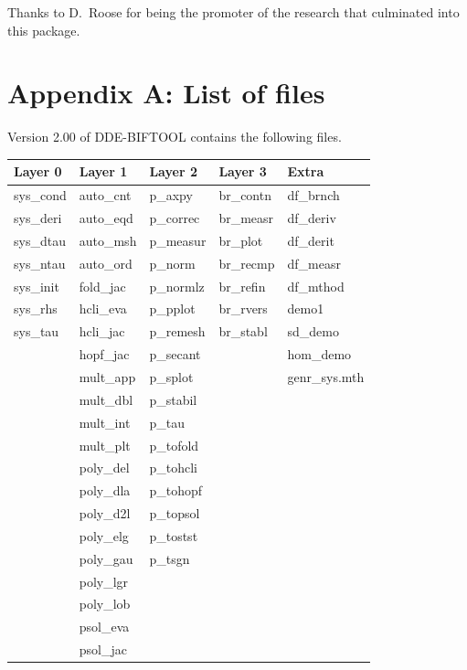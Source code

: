\documentclass[10pt]{article}
\gdef \DDEBIFCODE{{\scshape DDE-BIFTOOL}}
\begin{document}
{Thanks to D.~Roose for being the promoter of
the research that culminated into this package.





\newpage

\section*{Appendix A: List of files}

Version 2.00 of {\DDEBIFCODE} contains the following files.
\begin{center}
\begin{tabular}{lllll}
Layer 0   & Layer 1   & Layer 2   & Layer 3   & Extra     \\ \hline
sys\_cond & auto\_cnt & p\_axpy   & br\_contn & df\_brnch \\
sys\_deri & auto\_eqd & p\_correc & br\_measr & df\_deriv \\
sys\_dtau & auto\_msh & p\_measur & br\_plot  & df\_derit \\
sys\_ntau & auto\_ord & p\_norm   & br\_recmp & df\_measr \\
sys\_init & fold\_jac & p\_normlz & br\_refin & df\_mthod \\
sys\_rhs  & hcli\_eva & p\_pplot  & br\_rvers & demo1     \\
sys\_tau  & hcli\_jac & p\_remesh & br\_stabl & sd\_demo  \\
          & hopf\_jac & p\_secant &           & hom\_demo  \\ 
          & mult\_app & p\_splot  &           & genr\_sys.mth \\
          & mult\_dbl & p\_stabil \\
          & mult\_int & p\_tau    \\
          & mult\_plt & p\_tofold \\
          & poly\_del & p\_tohcli \\
          & poly\_dla & p\_tohopf \\
          & poly\_d2l & p\_topsol \\
          & poly\_elg & p\_tostst \\
          & poly\_gau & p\_tsgn   \\
          & poly\_lgr \\ 
          & poly\_lob \\
          & psol\_eva \\ 
          & psol\_jac \\

\end{tabular}
\end{center}}
\end{document}
